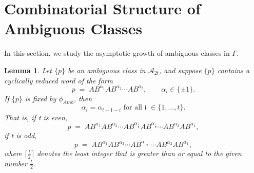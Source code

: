 \documentclass[a4paper,12pt]{amsart}
\numberwithin{equation}{section}
\newtheorem{lemma}[theorem]{Lemma}
\theoremstyle{definition}
\numberwithin{equation}{section}
\begin{document}
\section{Combinatorial Structure of Ambiguous Classes}
    In this section, we study the asymptotic growth of ambiguous classes in $\Gamma.$
    \begin {lemma}\label{3.1}
    Let $\{p\}$ be an ambiguous class in $\mathscr{A}_{2t}$, and suppose $\{p\}$ contains a cyclically reduced word of the form
    \[
    p \;=\; AB^{\alpha_1}AB^{\alpha_2}\cdots AB^{\alpha_{t}}, 
    \qquad \alpha_i \in \{\pm 1\}.
    \]
    If $\{p\}$ is fixed by $\phi_{Amb}$, then 
     $$ \alpha_i=\alpha_{t+1-i} \text{ for all i }\in\{1,\dots,t\}.$$
     That is, if t is even,
     \[
    p \;=\;
    AB^{\alpha_1}AB^{\alpha_2}\cdots AB^{\alpha_{\frac{t}{2}}}AB^{\alpha_{\frac{t}{2}}}\cdots AB^{\alpha_2}AB^{\alpha_1} ,
    \]
    if t is odd, 
     \[
    p \;=\;
    AB^{\alpha_1}AB^{\alpha_2}\cdots AB^{\alpha_{\lceil \frac{t}{2}\rceil}}\cdots AB^{\alpha_2}AB^{\alpha_1} ,
    \] where $\lceil \frac{t}{2} \rceil$ denotes the least integer that is greater than or equal to the given number $\frac{t}{2}$. 
    \end{lemma}
\end{document}
